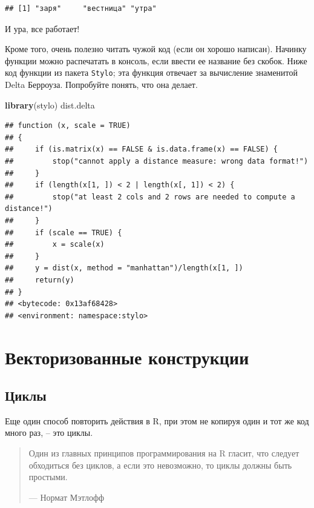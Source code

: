 \documentclass[
]{book}
\newenvironment{Shaded}{\begin{snugshade}}{\end{snugshade}}
\newcommand{\FunctionTok}[1]{\textcolor[rgb]{0.13,0.29,0.53}{\textbf{#1}}}
\newcommand{\NormalTok}[1]{#1}
\theoremstyle{definition}
\theoremstyle{definition}
\theoremstyle{definition}
\theoremstyle{definition}
\theoremstyle{remark}
\begin{document}
\begin{verbatim}
## [1] "заря"     "вестница" "утра"
\end{verbatim}

И ура, все работает!

Кроме того, очень полезно читать чужой код (если он хорошо написан). Начинку функции можно распечатать в консоль, если ввести ее название без скобок. Ниже код функции из пакета \texttt{Stylo}; эта функция отвечает за вычисление знаменитой Delta Берроуза. Попробуйте понять, что она делает.

\begin{Shaded}
\begin{Highlighting}[]
\FunctionTok{library}\NormalTok{(stylo)}
\NormalTok{dist.delta}
\end{Highlighting}
\end{Shaded}

\begin{verbatim}
## function (x, scale = TRUE) 
## {
##     if (is.matrix(x) == FALSE & is.data.frame(x) == FALSE) {
##         stop("cannot apply a distance measure: wrong data format!")
##     }
##     if (length(x[1, ]) < 2 | length(x[, 1]) < 2) {
##         stop("at least 2 cols and 2 rows are needed to compute a distance!")
##     }
##     if (scale == TRUE) {
##         x = scale(x)
##     }
##     y = dist(x, method = "manhattan")/length(x[1, ])
##     return(y)
## }
## <bytecode: 0x13af68428>
## <environment: namespace:stylo>
\end{verbatim}

\hypertarget{ux432ux435ux43aux442ux43eux440ux438ux437ux43eux432ux430ux43dux43dux44bux435-ux43aux43eux43dux441ux442ux440ux443ux43aux446ux438ux438}{%
\section{Векторизованные конструкции}\label{ux432ux435ux43aux442ux43eux440ux438ux437ux43eux432ux430ux43dux43dux44bux435-ux43aux43eux43dux441ux442ux440ux443ux43aux446ux438ux438}}

\hypertarget{ux446ux438ux43aux43bux44b}{%
\subsection{Циклы}\label{ux446ux438ux43aux43bux44b}}

Еще один способ повторить действия в R, при этом не копируя один и тот же код много раз, -- это циклы.

\begin{quote}
Один из главных принципов программирования на R гласит, что следует обходиться без циклов, а если это невозможно, то циклы должны быть простыми.

--- Нормат Мэтлофф
\end{quote}
\end{document}
